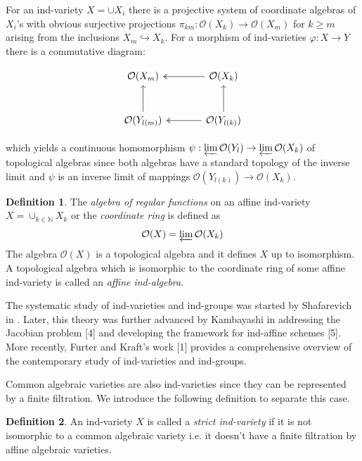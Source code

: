 \documentclass[a4paper,draft,reqno,12pt]{amsart}
\theoremstyle{definition}
\newtheorem{definition}{Definition}
\theoremstyle{remark}
\def\BN{{\mathbb N}}
\def\CO{\mathcal{O}}
\begin{document}
For an ind-variety $X = \cup X_i$ there is a projective system of coordinate algebras of $X_i$'s with obvious surjective projections $\pi_{km}:\CO(X_k)\to \CO(X_m)$ for $k \geq m$ arising from the inclusions $X_m \hookrightarrow X_k$. For a morphism of ind-varieties $\varphi: X \to Y$ there is a commutative diagram:

\[ \begin{tikzcd}[sep=large]
    \CO(X_m)  & \CO(X_k) \arrow[two heads]{l} \\%
    \CO(Y_{l(m)}) \arrow{u} & \CO(Y_{l(k)}) \arrow{u} \arrow[two heads]{l} 
    \end{tikzcd}
    \]

which yields a continuous homomorphism $\psi:\varprojlim\mathcal{O}(Y_l) \to \varprojlim\mathcal{O}(X_k)$ of topological algebras since both algebras have a standard topology of the inverse limit and $\psi$ is an inverse limit of mappings $\CO(Y_{l(k)}) \to \CO(X_k)$.

\begin{definition}\cite[Definition 1.1.4 (3)]{FK}
    The \emph{algebra of regular functions} on an affine ind-variety $X = \cup_{k\in\BN}X_k$ or the \emph{coordinate ring} is defined as \begin{equation*}
        \mathcal{O}(X) = \varprojlim\mathcal{O}(X_k)
    \end{equation*}
    The algebra $\mathcal{O}(X)$ is a topological algebra and it defines $X$ up to isomorphism. A topological algebra which is isomorphic to the coordinate ring of some affine ind-variety is called an \emph{affine ind-algebra}.
\end{definition}

The systematic study of ind-varieties and ind-groups was started by Shafarevich in \cite{SH1, SH2}. Later, this theory was further advanced by Kambayashi in addressing the Jacobian problem [4] and developing the framework for ind-affine schemes [5]. More recently, Furter and Kraft's work [1] provides a comprehensive overview of the contemporary study of ind-varieties and ind-groups.

Common algebraic varieties are also ind-varieties since they can be represented by a finite filtration. We introduce the following definition to separate this case.

\begin{definition}\label{strictdef}
    An ind-variety $X$ is called a \emph{strict ind-variety} if it is not isomorphic to a common algebraic variety i.e. it doesn't have a finite filtration by affine algebraic varieties.
\end{definition}
\end{document}
